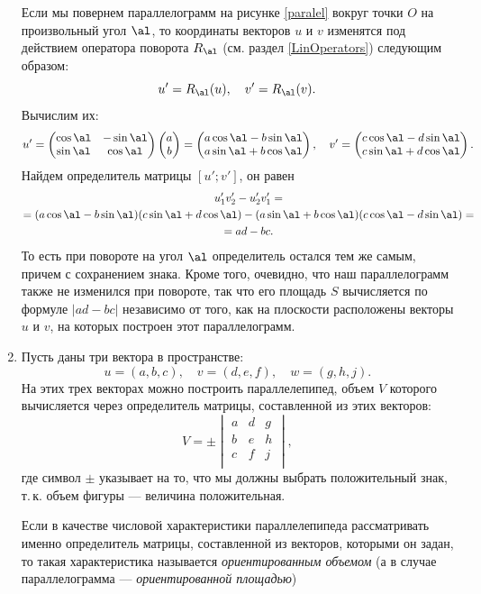 \begin{enumerate}
Если мы повернем параллелограмм на рисунке \ref{paralel} вокруг точки $O$ на произвольный угол $\al$, то координаты векторов $u$ и $v$ изменятся под действием оператора поворота $R_\al$ (см. раздел \ref{LinOperators}) следующим образом:
$$
u' = R_\al(u),\quad v' = R_\al(v).
$$
Вычислим их:
$$
u' = \begin{pmatrix}
\cos\al & -\sin\al \\
\sin\al & \cos\al
\end{pmatrix}
\begin{pmatrix}
a \\ b
\end{pmatrix}=
\begin{pmatrix}
a\cos\al - b\sin\al \\
a\sin\al + b\cos\al
\end{pmatrix},\quad
v' = \begin{pmatrix}
c\cos\al - d\sin\al \\
c\sin\al + d\cos\al
\end{pmatrix}.
$$
Найдем определитель матрицы $[u';v']$, он равен
\begin{multline*}
u'_1v'_2-u'_2v'_1 = \\
= (a\cos\al-b\sin\al)(c\sin\al+d\cos\al)-(a\sin\al+b\cos\al)(c\cos\al-d\sin\al)= \\ 
=ad-bc.
\end{multline*}
То есть при повороте на угол $\al$ определитель остался тем же самым, причем с сохранением знака. Кроме того, очевидно, что наш параллелограмм также не изменился при повороте, так что его площадь $S$ вычисляется по формуле $|ad-bc|$ независимо от того, как на плоскости расположены векторы $u$ и $v$, на которых построен этот параллелограмм.

\item Пусть даны три вектора в пространстве:
$$
u=(a,b,c),\quad v=(d,e,f),\quad w=(g,h,j).
$$
На этих трех векторах можно построить параллелепипед, объем $V$ которого вычисляется через определитель матрицы, составленной из этих векторов:
$$
V=\pm \begin{vmatrix}
a & d & g \\
b & e & h \\
c & f & j \\
\end{vmatrix},
$$
где символ $\pm$ указывает на то, что мы должны выбрать положительный знак, т.\,к. объем фигуры --- величина положительная.

Если в качестве числовой характеристики параллелепипеда рассматривать именно определитель матрицы, составленной из векторов, которыми он задан, то такая характеристика называется \textit{ориентированным объемом} (а в случае параллелограмма --- \textit{ориентированной площадью})


\end{enumerate}
